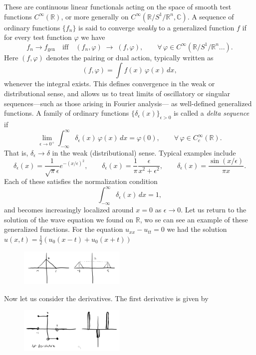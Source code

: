 \documentclass[11pt,a4paper]{article}
\begin{document}
These are continuous linear functionals acting on the space of smooth test functions 
$C^{\infty}(\mathbb{R})$, or more generally on $C^{\infty}(\mathbb{R}/S^{1}/\mathbb{R}^{n},\mathbb{C})$. 
A sequence of ordinary functions $\{f_{n}\}$ is said to converge \emph{weakly} to a generalized function $f$ 
if for every test function $\varphi$ we have
\[
f_{n} \to f_{\text{gen}} 
\quad \text{iff} \quad 
(f_{n},\varphi) \;\longrightarrow\; (f,\varphi),
\qquad 
\forall\,\varphi \in C^{\infty}(\mathbb{R}/S^{1}/\mathbb{R}^{n}...).
\]
Here $(f,\varphi)$ denotes the pairing or dual action, typically written as
\[
(f,\varphi) = \int f(x)\,\varphi(x)\,dx,
\]
whenever the integral exists.  
This defines convergence in the weak or distributional sense, 
and allows us to treat limits of oscillatory or singular sequences—such as those arising in Fourier analysis—
as well-defined generalized functions.
A family of ordinary functions $\{\delta_{\epsilon}(x)\}_{\epsilon>0}$ is called a 
\textit{delta sequence} if
\[
\lim_{\epsilon\to 0^{+}} \int_{-\infty}^{\infty} \delta_{\epsilon}(x)\,\varphi(x)\,dx 
= \varphi(0),
\qquad \forall\,\varphi\in C^{\infty}_{c}(\mathbb{R}).
\]
That is, $\delta_{\epsilon}\to\delta$ in the weak (distributional) sense.  
Typical examples include
\[
\delta_{\epsilon}(x)
= \frac{1}{\sqrt{\pi}\epsilon}e^{-(x/\epsilon)^{2}}, 
\qquad
\delta_{\epsilon}(x)
= \frac{1}{\pi}\frac{\epsilon}{x^{2}+\epsilon^{2}}, 
\qquad
\delta_{\epsilon}(x)
= \frac{\sin(x/\epsilon)}{\pi x}.
\]
Each of these satisfies the normalization condition
\[
\int_{-\infty}^{\infty}\delta_{\epsilon}(x)\,dx = 1,
\]
and becomes increasingly localized around $x=0$ as $\epsilon\to 0$. Let us return to the solution of the wave equation we found on $\mathbb{R}$, wo se can see an example of these generalized functions. For the equation $u_{xx}-u_{tt} = 0$ we had the solution  $u(x,t) = \frac{1}{2}(u_{0}(x-t)+u_{0}(x+t))$
\begin{figure}[H]
	\centering
	\includegraphics[width=0.45\textwidth]{wave1.png} %
\end{figure}
Now let us consider the derivatives. The first derivative is given by
\begin{figure}[H]
	\centering
	\includegraphics[width=0.45\textwidth]{derivatives.png} %
\end{figure}
\end{document}
